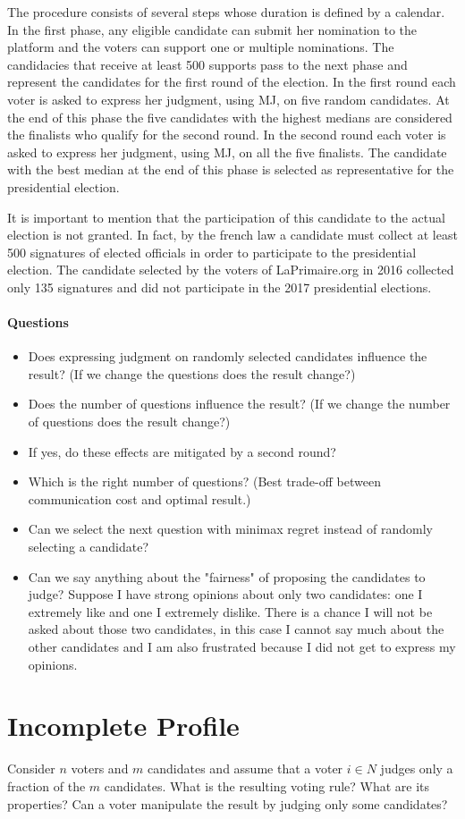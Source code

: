 \documentclass[version=3.21, pagesize, twoside=off, bibliography=totoc, DIV=calc, fontsize=12pt, a4paper]{scrartcl}
\begin{document}
The procedure consists of several steps whose duration is defined by a calendar. In the first phase, any eligible candidate can submit her nomination to the platform and the voters can support one or multiple nominations. The candidacies that receive at least 500 supports pass to the next phase and represent the candidates for the first round of the election. In the first round each voter is asked to express her judgment, using \acs{MJ}, on five random candidates. At the end of this phase the five candidates with the highest medians are considered the finalists who qualify for the second round. In the second round each voter is asked to express her judgment, using \acs{MJ}, on all the five finalists. The candidate with the best median at the end of this phase is selected as representative for the presidential election.

It is important to mention that the participation of this candidate to the actual election is not granted. In fact, by the french law a candidate must collect at least 500 signatures of elected officials in order to participate to the presidential election. The candidate selected by the voters of LaPrimaire.org in 2016 collected only 135 signatures and did not participate in the 2017 presidential elections.  

\paragraph{Questions}
\begin{itemize}
	\item Does expressing judgment on randomly selected candidates influence the result? (If we change the questions does the result change?)
	\item Does the number of questions influence the result? (If we change the number of questions does the result change?)
	\item If yes, do these effects are mitigated by a second round?
	\item Which is the right number of questions? (Best trade-off between communication cost and optimal result.)
	\item Can we select the next question with minimax regret instead of randomly selecting a candidate?
	\item Can we say anything about the "fairness" of proposing the candidates to judge? Suppose I have strong opinions about only two candidates: one I extremely like and one I extremely dislike. There is a chance I will not be asked about those two candidates, in this case I cannot say much about the other candidates and I am also frustrated because I did not get to express my opinions.
\end{itemize}


\section{Incomplete Profile}
Consider $n$ voters and $m$ candidates and assume that a voter $i \in N$ judges only a fraction of the $m$ candidates. What is the resulting voting rule? What are its properties? Can a voter manipulate the result by judging only some candidates? 


\end{document}

